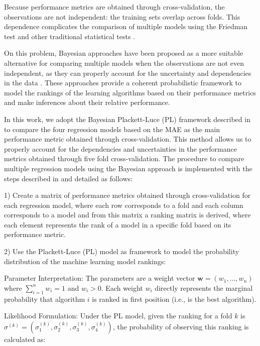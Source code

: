 Because performance metrics are obtained through cross-validation, the observations are not independent: the training sets overlap across folds. This dependence complicates the comparison of multiple models using the Friedman test and other traditional statistical tests \cite{demsar2006statistical}.

On this problem, Bayesian approaches have been proposed as a more suitable alternative for comparing multiple models when the observations are not even independent, as they can properly account for the uncertainty and dependencies in the data \cite{benavoli2017time,  mollica2017bayesian, calvo2018bayesian}. These approaches provide a coherent probabilistic framework to model the rankings of the learning algorithms based on their performance metrics and make inferences about their relative performance.

In this work, we adopt the Bayesian Plackett-Luce (PL) framework described in \cite{calvo2018bayesian} to compare the four regression models based on the MAE as the main performance metric obtained through cross-validation. This method allows us to properly account for the dependencies and uncertainties in the performance metrics obtained through five fold cross-validation. The procedure to compare multiple regression models using the Bayesian approach is implemented with the steps described in \cite{calvo2018bayesian} and detailed as follows:

1) Create a matrix of performance metrics obtained through cross-validation for each regression model, where each row corresponds to a fold and each column corresponds to a model and from this matrix a ranking matrix is derived, where each element represents the rank of a model in a specific fold based on its performance metric.

2) Use the Plackett-Luce (PL) model as framework to model the probability distribution of the machine learning model rankings:

Parameter Interpretation: The parameters are a weight vector $\mathbf{w} = (w_1, \dots, w_n)$ where $\sum_{i=1}^n w_i = 1$ and $w_i > 0$. Each weight $w_i$ directly represents the marginal probability that algorithm $i$ is ranked in first position (i.e., is the best algorithm).

Likelihood Formulation: Under the PL model, given the ranking for a fold $k$ is $\sigma^{(k)} = (\sigma_1^{(k)}, \sigma_2^{(k)}, \sigma_3^{(k)}, \sigma_4^{(k)})$, the probability of observing this ranking is calculated as: 

